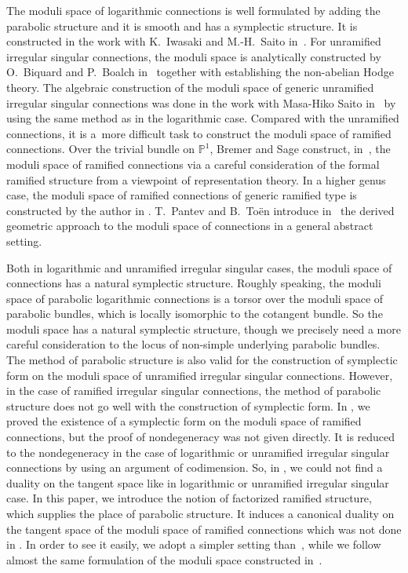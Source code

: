 \documentclass[pdftex]{sigma}
\numberwithin{equation}{section}
\begin{document}
The moduli space of logarithmic connections is well formulated by adding the
parabolic structure and it is smooth and has a symplectic structure.
It is constructed in the work with K.~Iwasaki and M.-H.~Saito in~\cite{Inaba-1, IIS-1}.
For unramified irregular singular connections,
the moduli space is analytically constructed by O.~Biquard and P.~Boalch in~\cite{Biquard-Boalch} together with establishing the
non-abelian Hodge theory.
The algebraic construction of the moduli space of generic unramified irregular singular connections
was done in the work with Masa-Hiko Saito in~\cite{Inaba-Saito}
by using the same method as in the logarithmic case.
Compared with the unramified connections,
it is a~more difficult task to construct the
moduli space of ramified connections.
Over the trivial bundle on $\mathbb{P}^1$,
Bremer and Sage construct, in~\cite{Bremer-Sage-1},
the moduli space of ramified connections
via a careful consideration of the formal ramified structure
from a viewpoint of representation theory.
In a higher genus case, the moduli space of ramified connections of generic ramified type
is constructed by the author in \cite{Inaba-2}.
T.~Pantev and B.~To\"{e}n introduce in~\cite{Pantev-Toen} the derived geometric approach to
the moduli space of connections in a general abstract setting.


Both in logarithmic and unramified irregular singular cases,
the moduli space of connections has a natural symplectic structure.
Roughly speaking, the moduli space of parabolic logarithmic connections
is a torsor over the moduli space of parabolic bundles,
which is locally isomorphic to the cotangent bundle.
So the moduli space has a natural symplectic structure,
though we precisely need a more careful consideration to the locus of
non-simple underlying parabolic bundles.
The method of parabolic structure is also valid for the construction of symplectic form
on the moduli space of unramified irregular singular connections.
However, in the case of ramified irregular singular connections,
the method of parabolic structure does not go well with the construction of symplectic form.
In \cite[Theorem 4.1]{Inaba-2}, we proved the existence of a symplectic form
on the moduli space of ramified connections,
but the proof of nondegeneracy was not given directly.
It is reduced to the nondegeneracy
in the case of logarithmic or unramified irregular singular connections
by using an argument of codimension.
So, in \cite{Inaba-2}, we could not find a duality on the tangent space
like in logarithmic or unramified irregular singular case.
In this paper, we introduce the notion of factorized ramified structure,
which supplies the place of parabolic structure.
It induces a canonical duality on the tangent space of
the moduli space of ramified connections which was not done in \cite{Inaba-2}.
In order to see it easily, we adopt a simpler setting than~\cite{Inaba-2},
while we follow almost the same formulation of the moduli space
constructed in~\cite{Inaba-2}.
\end{document}
